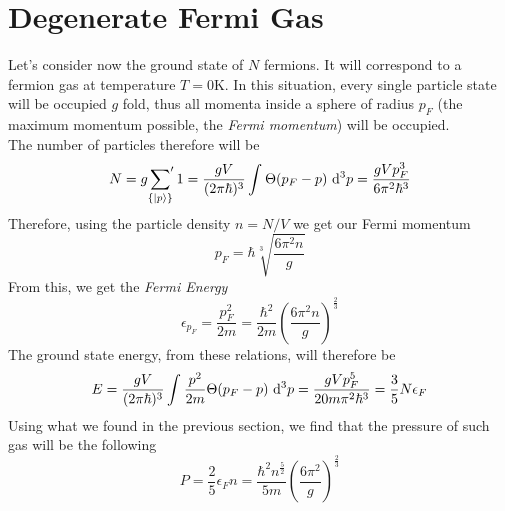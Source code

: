 \documentclass[../qm.tex]{subfiles}
\begin{document}
	\section{Degenerate Fermi Gas}
	Let's consider now the ground state of $N$ fermions. It will correspond to a fermion gas at temperature $T=0$K. In this situation, every single particle state will be occupied $g$ fold, thus all momenta inside a sphere of radius $p_F$ (the maximum momentum possible, the \textit{Fermi momentum}) will be occupied.\\
	The number of particles therefore will be
	\begin{equation}
		N=g\qsum_{\{\ket{p}\}}1=\frac{gV}{(2\pi\hbar)^3}\int_{}^{}\Theta(p_F-p)\diff[3]{p}=\frac{gVp_F^3}{6\pi^2\hbar^3}
		\label{eq:particlenumbfermigas}
	\end{equation}
	Therefore, using the particle density $n=N/V$ we get our Fermi momentum
	\begin{equation}
		p_F=\hbar\sqrt[3]{\frac{6\pi^2n}{g}}
		\label{eq:fermimomentum}
	\end{equation}
	From this, we get the \textit{Fermi Energy}
	\begin{equation}
		\epsilon_{p_F}=\frac{p_F^2}{2m}=\frac{\hbar^2}{2m}\left( \frac{6\pi^2n}{g} \right)^{\frac{2}{3}}
		\label{eq:fermienergy}
	\end{equation}
	The ground state energy, from these relations, will therefore be
	\begin{equation}
		E=\frac{gV}{(2\pi\hbar)^3}\int_{}^{}\frac{p^2}{2m}\Theta(p_F-p)\diff[3]{p}=\frac{gVp_F^5}{20m\pi^2\hbar^3}=\frac{3}{5}N\epsilon_F
		\label{eq:gsfermigas}
	\end{equation}
	Using what we found in the previous section, we find that the pressure of such gas will be the following
	\begin{equation}
		P=\frac{2}{5}\epsilon_Fn=\frac{\hbar^2n^{\frac{5}{2}}}{5m}\left( \frac{6\pi^2}{g} \right)^{\frac{2}{3}}
		\label{eq:fermigaspressure}
	\end{equation}
\end{document}
